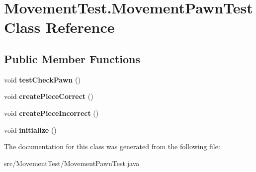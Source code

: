 \hypertarget{class_movement_test_1_1_movement_pawn_test}{\section{Movement\-Test.\-Movement\-Pawn\-Test Class Reference}
\label{class_movement_test_1_1_movement_pawn_test}
}
\subsection*{Public Member Functions}
\begin{DoxyCompactItemize}
\item 
\hypertarget{class_movement_test_1_1_movement_pawn_test_a15d16d880df29ebdcebd7cfa84d3beda}{void {\bfseries test\-Check\-Pawn} ()}\label{class_movement_test_1_1_movement_pawn_test_a15d16d880df29ebdcebd7cfa84d3beda}

\item 
\hypertarget{class_movement_test_1_1_movement_pawn_test_a54271572194dd257866c416878b5e55a}{void {\bfseries create\-Piece\-Correct} ()}\label{class_movement_test_1_1_movement_pawn_test_a54271572194dd257866c416878b5e55a}

\item 
\hypertarget{class_movement_test_1_1_movement_pawn_test_abd01daf4dbc21f245bc1c9b1405c3595}{void {\bfseries create\-Piece\-Incorrect} ()}\label{class_movement_test_1_1_movement_pawn_test_abd01daf4dbc21f245bc1c9b1405c3595}

\item 
\hypertarget{class_movement_test_1_1_movement_pawn_test_a5fe1d5869ae93a11ce0956da920a6b4d}{void {\bfseries initialize} ()}\label{class_movement_test_1_1_movement_pawn_test_a5fe1d5869ae93a11ce0956da920a6b4d}

\end{DoxyCompactItemize}


The documentation for this class was generated from the following file\-:\begin{DoxyCompactItemize}
\item 
src/\-Movement\-Test/Movement\-Pawn\-Test.\-java\end{DoxyCompactItemize}
